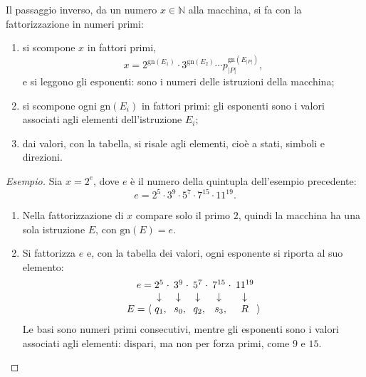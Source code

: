\documentclass[a4paper, 11pt, oneside]{book}
\theoremstyle{formale}
\newenvironment{esempio}
    {\begin{proof}[\textit{Esempio}]\renewcommand{\qedsymbol}{$\diamond$}}
    {\end{proof}}
\begin{document}
    Il passaggio inverso, da un numero $x \in \mathbb{N}$ alla macchina, si fa con la
    fattorizzazione in numeri primi:
    \begin{enumerate}
        \item si scompone $x$ in fattori primi,
            \begin{equation*}
                x = 2^{\mathrm{gn}(E_1)} \cdot 3^{\mathrm{gn}(E_2)} \cdots
                p_{|P|}^{\mathrm{gn}(E_{|P|})},
            \end{equation*}
            e si leggono gli esponenti: sono i numeri delle istruzioni della macchina;
        \item si scompone ogni $\mathrm{gn}(E_i)$ in fattori primi: gli esponenti sono i
            valori associati agli elementi dell'istruzione $E_i$;
        \item dai valori, con la tabella, si risale agli elementi, cio\`e a stati, simboli
            e direzioni.
    \end{enumerate}

    \begin{esempio}
        Sia $x = 2^{e}$, dove $e$ \`e il numero della quintupla dell'esempio precedente:
        \begin{equation*}
            e = 2^{5} \cdot 3^{9} \cdot 5^{7} \cdot 7^{15} \cdot 11^{19}.
        \end{equation*}
        \begin{enumerate}
            \item Nella fattorizzazione di $x$ compare solo il primo $2$, quindi la
                macchina ha una sola istruzione $E$, con $\mathrm{gn}(E) = e$.
            \item Si fattorizza $e$ e, con la tabella dei valori, ogni esponente si
                riporta al suo elemento:
                \begin{equation*}
                    \begin{array}{r@{\;}c@{\quad}c@{\quad}c@{\quad}c@{\quad}c@{\;}l}
                        e = & 2^{5}\mathrlap{\;\cdot} & 3^{9}\mathrlap{\;\cdot}
                            & 5^{7}\mathrlap{\;\cdot} & 7^{15}\mathrlap{\;\cdot}
                            & 11^{19} & \\
                        & \downarrow & \downarrow & \downarrow & \downarrow
                            & \downarrow & \\
                        E = \langle & q_1\mathrlap{,} & s_0\mathrlap{,}
                            & q_2\mathrlap{,} & s_3\mathrlap{,} & R & \rangle
                    \end{array}
                \end{equation*}
                \noindent Le basi sono numeri primi consecutivi, mentre gli esponenti sono i valori
                associati agli elementi: dispari, ma non per forza primi, come $9$ e
                $15$.
        \end{enumerate}
    \end{esempio}
\end{document}
